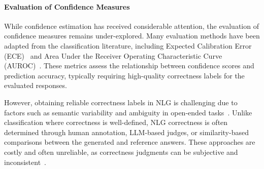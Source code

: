 



\paragraph{Evaluation of Confidence Measures}
While confidence estimation has received considerable attention, the evaluation of confidence measures remains under-explored. 
Many evaluation methods have been adapted from the classification literature, including Expected Calibration Error (ECE)~\cite{ICML2017_Guo,xiong2024can} and Area Under the Receiver Operating Characteristic Curve (AUROC)~\cite{kuhn2023semantic}. 
These metrics assess the relationship between confidence scores and prediction accuracy, typically requiring high-quality correctness labels for the evaluated responses.

However, obtaining reliable correctness labels in NLG is challenging due to factors such as semantic variability and ambiguity in open-ended tasks~\cite{novikova2017we}. 
Unlike classification where correctness is well-defined, NLG correctness is often determined through human annotation, LLM-based judges, or similarity-based comparisons between the generated and reference answers. 
These approaches are costly and often unreliable, as correctness judgments can be subjective and inconsistent~\cite{gatt2018survey}.

